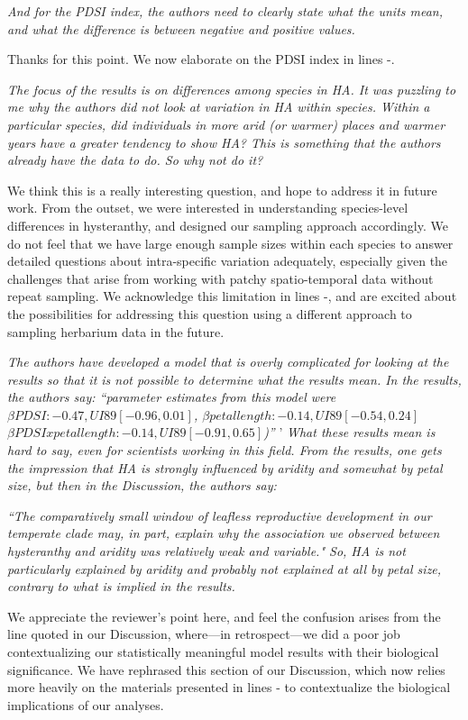 \documentclass{article}[12pt]
\begin{document}
\emph{And for the PDSI index, the authors need to clearly state what the units mean, and what the difference is between negative and positive values.} 

Thanks for this point. We now elaborate on the PDSI index in lines -.

\emph{The focus of the results is on differences among species in HA.  It was puzzling to me why the authors did not look at variation in HA within species. Within a particular species, did individuals in more arid (or warmer) places and warmer years have a greater tendency to show HA? This is something that the authors already have the data to do. So why not do it?}

We think this is a really interesting question, and hope to address it in future work. From the outset, we were interested in understanding species-level differences in hysteranthy, and designed our sampling approach accordingly.
We do not feel that we have large enough sample sizes within each species to answer detailed questions about intra-specific variation adequately, especially given the challenges that arise from working with patchy spatio-temporal data without repeat sampling. We acknowledge this limitation in lines -, and are excited about the possibilities for addressing this question using a different approach to sampling herbarium data in the future.

\emph{The authors have developed a model that is overly complicated for looking at the results so that it is not possible to determine what the results mean. In the results, the authors say: 
``parameter estimates from this model were $\beta PDSI : −0.47,UI89[−0.96,0.01]$, $\beta petal length : −0.14,UI89[−0.54,0.24]$ $\beta PDSIxpetal length : −0.14,UI89[−0.91,0.65]$)''}
'
\emph{What these results mean is hard to say, even for scientists working in this field.  From the results, one gets the impression that HA is strongly influenced by aridity and somewhat by petal size, but then in the Discussion, the authors say:}

\emph{``The comparatively small window of leafless reproductive development in our temperate clade may, in part, explain why the association we observed between hysteranthy and aridity was relatively weak and variable." So, HA is not particularly explained by aridity and probably not explained at all by petal size, contrary to what is implied in the results.}

We appreciate the reviewer's point here, and feel the confusion arises from the line quoted in our Discussion, where---in retrospect---we did a poor job contextualizing our statistically meaningful model results with their biological significance. We have rephrased this section of our Discussion, which now relies more heavily on the materials presented in lines - to contextualize the biological implications of our analyses. 
\end{document}
